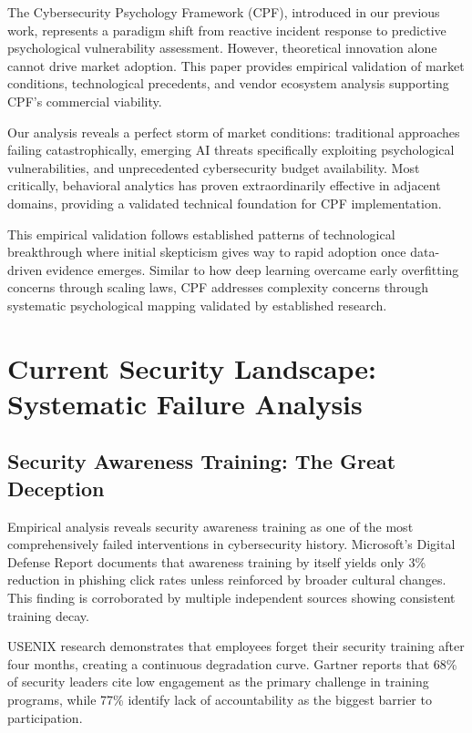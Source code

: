 \documentclass[11pt,a4paper]{article}
\begin{document}
The Cybersecurity Psychology Framework (CPF), introduced in our previous work\cite{canale2024cpf}, represents a paradigm shift from reactive incident response to predictive psychological vulnerability assessment. However, theoretical innovation alone cannot drive market adoption. This paper provides empirical validation of market conditions, technological precedents, and vendor ecosystem analysis supporting CPF's commercial viability.

Our analysis reveals a perfect storm of market conditions: traditional approaches failing catastrophically, emerging AI threats specifically exploiting psychological vulnerabilities, and unprecedented cybersecurity budget availability. Most critically, behavioral analytics has proven extraordinarily effective in adjacent domains, providing a validated technical foundation for CPF implementation.

This empirical validation follows established patterns of technological breakthrough where initial skepticism gives way to rapid adoption once data-driven evidence emerges. Similar to how deep learning overcame early overfitting concerns through scaling laws, CPF addresses complexity concerns through systematic psychological mapping validated by established research.

\section{Current Security Landscape: Systematic Failure Analysis}

\subsection{Security Awareness Training: The Great Deception}

Empirical analysis reveals security awareness training as one of the most comprehensively failed interventions in cybersecurity history. Microsoft's Digital Defense Report documents that awareness training by itself yields only 3\% reduction in phishing click rates unless reinforced by broader cultural changes\cite{microsoft2024}. This finding is corroborated by multiple independent sources showing consistent training decay.

USENIX research demonstrates that employees forget their security training after four months\cite{usenix2024}, creating a continuous degradation curve. Gartner reports that 68\% of security leaders cite low engagement as the primary challenge in training programs\cite{gartner2024}, while 77\% identify lack of accountability as the biggest barrier to participation\cite{infrascale2024}.
\end{document}
